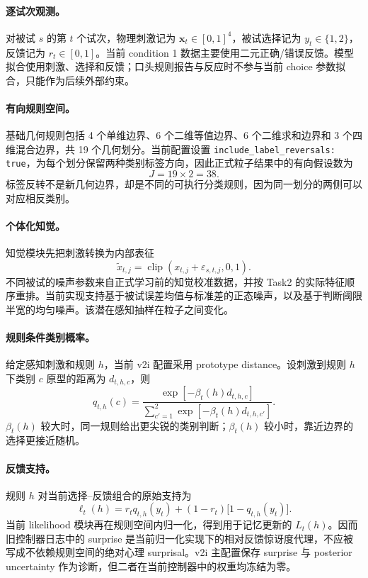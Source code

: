 \paragraph{逐试次观测。}
对被试 $s$ 的第 $t$ 个试次，物理刺激记为 $\mathbf x_t\in[0,1]^4$，被试选择记为 $y_t\in\{1,2\}$，反馈记为 $r_t\in[0,1]$。当前 condition 1 数据主要使用二元正确/错误反馈。模型拟合使用刺激、选择和反馈；口头规则报告与反应时不参与当前 choice 参数拟合，只能作为后续外部约束。

\paragraph{有向规则空间。}
基础几何规则包括 4 个单维边界、6 个二维等值边界、6 个二维求和边界和 3 个四维混合边界，共 19 个几何划分。当前配置设置
\texttt{include\_label\_reversals: true}，为每个划分保留两种类别标签方向，因此正式粒子结果中的有向假设数为
\begin{equation}
J=19\times 2=38.
\label{eq:model0811-hypothesis-count}
\end{equation}
标签反转不是新几何边界，却是不同的可执行分类规则，因为同一划分的两侧可以对应相反类别。

\paragraph{个体化知觉。}
知觉模块先把刺激转换为内部表征
\begin{equation}
\widetilde x_{t,j}
=\operatorname{clip}(x_{t,j}+\varepsilon_{s,t,j},0,1).
\label{eq:model0811-perception}
\end{equation}
不同被试的噪声参数来自正式学习前的知觉校准数据，并按 Task2 的实际特征顺序重排。当前实现支持基于被试误差均值与标准差的正态噪声，以及基于判断阈限半宽的均匀噪声。该潜在感知抽样在粒子之间变化。

\paragraph{规则条件类别概率。}
给定感知刺激和规则 $h$，当前 v2i 配置采用 prototype distance。设刺激到规则 $h$ 下类别 $c$ 原型的距离为 $d_{t,h,c}$，则
\begin{equation}
q_{t,h}(c)
=
\frac{\exp[-\beta_t(h)d_{t,h,c}]}
{\sum_{c'=1}^{2}\exp[-\beta_t(h)d_{t,h,c'}]}.
\label{eq:model0811-rule-choice}
\end{equation}
$\beta_t(h)$ 较大时，同一规则给出更尖锐的类别判断；$\beta_t(h)$ 较小时，靠近边界的选择更接近随机。

\paragraph{反馈支持。}
规则 $h$ 对当前选择--反馈组合的原始支持为
\begin{equation}
\ell_t(h)
=r_tq_{t,h}(y_t)
+(1-r_t)\bigl[1-q_{t,h}(y_t)\bigr].
\label{eq:model0811-feedback-support}
\end{equation}
当前 likelihood 模块再在规则空间内归一化，得到用于记忆更新的 $L_t(h)$。因而旧控制器日志中的 surprise 是当前归一化实现下的相对反馈惊讶度代理，不应被写成不依赖规则空间的绝对心理 surprisal。v2i 主配置保存 surprise 与 posterior uncertainty 作为诊断，但二者在当前控制器中的权重均冻结为零。


